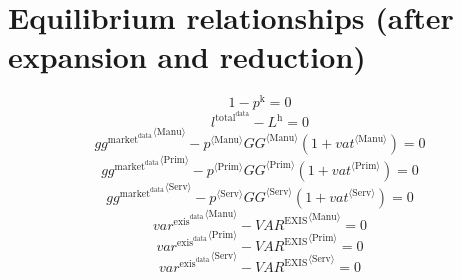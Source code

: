 \section{Equilibrium relationships (after expansion and reduction)}

\begin{equation}
1 - p^{\mathrm{k}} = 0
\end{equation}
\begin{equation}
l^{\mathrm{total}^{\mathrm{data}}} - L^{\mathrm{h}} = 0
\end{equation}
\begin{equation}
{{g\!g}^{\mathrm{market}^{\mathrm{data}}}}^{\langle \mathrm{\mathrm{Manu}}\rangle} - {{p}^{\langle \mathrm{Manu}\rangle}} {{{G\!G}}^{\langle \mathrm{Manu}\rangle}} \left(1 + {{v\!a\!t}}^{\langle \mathrm{\mathrm{Manu}}\rangle}\right) = 0
\end{equation}
\begin{equation}
{{g\!g}^{\mathrm{market}^{\mathrm{data}}}}^{\langle \mathrm{\mathrm{Prim}}\rangle} - {{p}^{\langle \mathrm{Prim}\rangle}} {{{G\!G}}^{\langle \mathrm{Prim}\rangle}} \left(1 + {{v\!a\!t}}^{\langle \mathrm{\mathrm{Prim}}\rangle}\right) = 0
\end{equation}
\begin{equation}
{{g\!g}^{\mathrm{market}^{\mathrm{data}}}}^{\langle \mathrm{\mathrm{Serv}}\rangle} - {{p}^{\langle \mathrm{Serv}\rangle}} {{{G\!G}}^{\langle \mathrm{Serv}\rangle}} \left(1 + {{v\!a\!t}}^{\langle \mathrm{\mathrm{Serv}}\rangle}\right) = 0
\end{equation}
\begin{equation}
{{v\!a\!r}^{\mathrm{exis}^{\mathrm{data}}}}^{\langle \mathrm{\mathrm{Manu}}\rangle} - {{V\!A\!R}^{\mathrm{EXIS}}}^{\langle \mathrm{Manu}\rangle} = 0
\end{equation}
\begin{equation}
{{v\!a\!r}^{\mathrm{exis}^{\mathrm{data}}}}^{\langle \mathrm{\mathrm{Prim}}\rangle} - {{V\!A\!R}^{\mathrm{EXIS}}}^{\langle \mathrm{Prim}\rangle} = 0
\end{equation}
\begin{equation}
{{v\!a\!r}^{\mathrm{exis}^{\mathrm{data}}}}^{\langle \mathrm{\mathrm{Serv}}\rangle} - {{V\!A\!R}^{\mathrm{EXIS}}}^{\langle \mathrm{Serv}\rangle} = 0
\end{equation}
